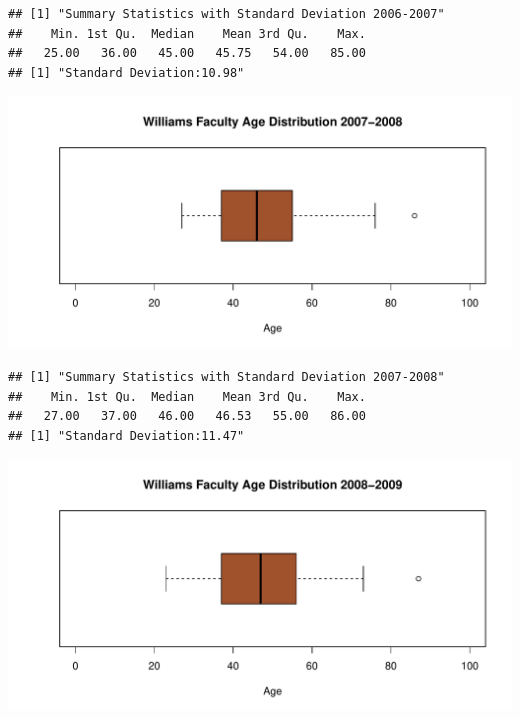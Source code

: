 \documentclass[12pt,a4paper]{article}\usepackage[]{graphicx}\usepackage[]{color}
\makeatletter
\def\maxwidth{ %
  \ifdim\Gin@nat@width>\linewidth
    \linewidth
  \else
    \Gin@nat@width
  \fi
}
\newenvironment{kframe}{%
 \def\at@end@of@kframe{}%
 \ifinner\ifhmode%
  \def\at@end@of@kframe{\end{minipage}}%
  \begin{minipage}{\columnwidth}%
 \fi\fi%
 \def\FrameCommand##1{\hskip\@totalleftmargin \hskip-\fboxsep
 \colorbox{shadecolor}{##1}\hskip-\fboxsep
     \hskip-\linewidth \hskip-\@totalleftmargin \hskip\columnwidth}%
 \MakeFramed {\advance\hsize-\width
   \@totalleftmargin\z@ \linewidth\hsize
   \@setminipage}}%
 {\par\unskip\endMakeFramed%
 \at@end@of@kframe}
\newenvironment{knitrout}{}{} %
\theoremstyle{definition}
\makeatother
\begin{document}
\begin{knitrout}
\color{fgcolor}\begin{kframe}
\begin{verbatim}
## [1] "Summary Statistics with Standard Deviation 2006-2007"
##    Min. 1st Qu.  Median    Mean 3rd Qu.    Max. 
##   25.00   36.00   45.00   45.75   54.00   85.00
## [1] "Standard Deviation:10.98"
\end{verbatim}
\end{kframe}
\end{knitrout}

\begin{knitrout}
\color{fgcolor}
\includegraphics[width=\maxwidth]{figure/unnamed-chunk-20-1} 

\end{knitrout}

\begin{knitrout}
\color{fgcolor}\begin{kframe}
\begin{verbatim}
## [1] "Summary Statistics with Standard Deviation 2007-2008"
##    Min. 1st Qu.  Median    Mean 3rd Qu.    Max. 
##   27.00   37.00   46.00   46.53   55.00   86.00
## [1] "Standard Deviation:11.47"
\end{verbatim}
\end{kframe}
\end{knitrout}


\begin{knitrout}
\color{fgcolor}
\includegraphics[width=\maxwidth]{figure/unnamed-chunk-22-1} 

\end{knitrout}
\end{document}
